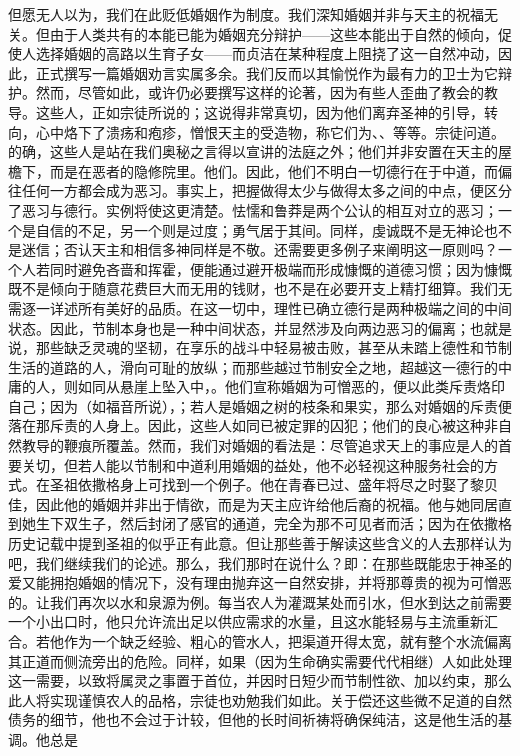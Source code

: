 但愿无人以为，我们在此贬低婚姻作为制度。我们深知婚姻并非与天主的祝福无关。但由于人类共有的本能已能为婚姻充分辩护——这些本能出于自然的倾向，促使人选择婚姻的高路以生育子女——而贞洁在某种程度上阻挠了这一自然冲动，因此，正式撰写一篇婚姻劝言实属多余。我们反而以其愉悦作为最有力的卫士为它辩护。然而，尽管如此，或许仍必要撰写这样的论著，因为有些人歪曲了教会的教导。这些人，正如宗徒所说的；这说得非常真切，因为他们离弃圣神的引导，转向，心中烙下了溃疡和疱疹，憎恨天主的受造物，称它们为、、等等。宗徒问道。的确，这些人是站在我们奥秘之言得以宣讲的法庭之外；他们并非安置在天主的屋檐下，而是在恶者的隐修院里。他们。因此，他们不明白一切德行在于中道，而偏往任何一方都会成为恶习。事实上，把握做得太少与做得太多之间的中点，便区分了恶习与德行。实例将使这更清楚。怯懦和鲁莽是两个公认的相互对立的恶习；一个是自信的不足，另一个则是过度；勇气居于其间。同样，虔诚既不是无神论也不是迷信；否认天主和相信多神同样是不敬。还需要更多例子来阐明这一原则吗？一个人若同时避免吝啬和挥霍，便能通过避开极端而形成慷慨的道德习惯；因为慷慨既不是倾向于随意花费巨大而无用的钱财，也不是在必要开支上精打细算。我们无需逐一详述所有美好的品质。在这一切中，理性已确立德行是两种极端之间的中间状态。因此，节制本身也是一种中间状态，并显然涉及向两边恶习的偏离；也就是说，那些缺乏灵魂的坚韧，在享乐的战斗中轻易被击败，甚至从未踏上德性和节制生活的道路的人，滑向可耻的放纵；而那些越过节制安全之地，超越这一德行的中庸的人，则如同从悬崖上坠入中，。他们宣称婚姻为可憎恶的，便以此类斥责烙印自己；因为（如福音所说），；若人是婚姻之树的枝条和果实，那么对婚姻的斥责便落在那斥责的人身上。因此，这些人如同已被定罪的囚犯；他们的良心被这种非自然教导的鞭痕所覆盖。然而，我们对婚姻的看法是：尽管追求天上的事应是人的首要关切，但若人能以节制和中道利用婚姻的益处，他不必轻视这种服务社会的方式。在圣祖依撒格身上可找到一个例子。他在青春已过、盛年将尽之时娶了黎贝佳，因此他的婚姻并非出于情欲，而是为天主应许给他后裔的祝福。他与她同居直到她生下双生子，然后封闭了感官的通道，完全为那不可见者而活；因为在依撒格历史记载中提到圣祖的似乎正有此意。但让那些善于解读这些含义的人去那样认为吧，我们继续我们的论述。那么，我们那时在说什么？即：在那些既能忠于神圣的爱又能拥抱婚姻的情况下，没有理由抛弃这一自然安排，并将那尊贵的视为可憎恶的。让我们再次以水和泉源为例。每当农人为灌溉某处而引水，但水到达之前需要一个小出口时，他只允许流出足以供应需求的水量，且这水能轻易与主流重新汇合。若他作为一个缺乏经验、粗心的管水人，把渠道开得太宽，就有整个水流偏离其正道而侧流旁出的危险。同样，如果（因为生命确实需要代代相继）人如此处理这一需要，以致将属灵之事置于首位，并因时日短少而节制性欲、加以约束，那么此人将实现谨慎农人的品格，宗徒也劝勉我们如此。关于偿还这些微不足道的自然债务的细节，他也不会过于计较，但他的长时间祈祷将确保纯洁，这是他生活的基调。他总是